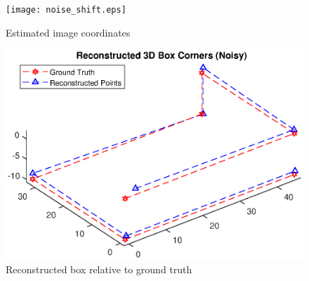 \documentclass[12pt]{article}
\begin{document}
\begin{figure}[h]
	\centering %
	\captionsetup{justification=centering}
	\begin{minipage}{0.5\textwidth}
		\centering
		\texttt{[image: noise\_shift.eps]}
		\caption{Estimated image coordinates} \label{noiseshift}
	\end{minipage}\hfill
	\begin{minipage}{0.5\textwidth}
		\centering %
		\includegraphics[width=1\textwidth]{noise_shift_recon.eps}
		\caption{Reconstructed box relative to ground truth} \label{noiserecon}
	\end{minipage}
\end{figure}
\end{document}

